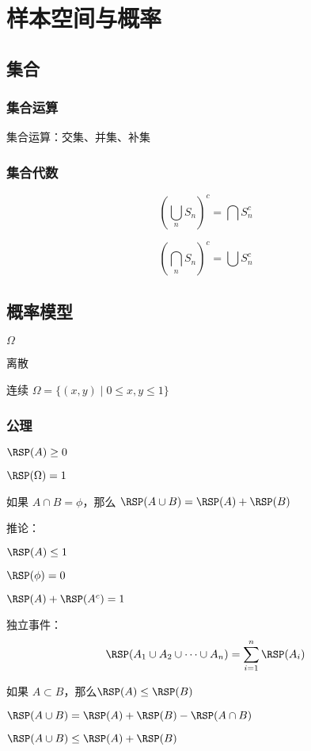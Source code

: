 \chapter{样本空间与概率}

\section{集合}

\subsection{集合运算}

集合运算：交集、并集、补集

\subsection{集合代数}


$$(\bigcup_n S_n)^c = \bigcap S_n^c$$ 

$$(\bigcap_n S_n)^c = \bigcup S_n^c$$ 

\section{概率模型}

 $\Omega$

离散

连续 $\Omega = \{(x,y) \mid 0 \leq x, y \leq 1 \}$ 

\subsection{公理}
 

 \begin{ol}
   \item $\RSP(A) \geq 0$
   \item $\RSP(\Omega) = 1$
   \item 如果 $A \cap B = \phi$，那么 $\RSP(A \cup B) = \RSP(A) + \RSP(B)$
 \end{ol}

 推论：

\begin{ul}
  \item $\RSP(A) \leq 1$
  \item $\RSP(\phi) = 0$
  \item $\RSP(A) + \RSP(A^c) = 1$
  \item 独立事件：$$\RSP(A_1 \cup A_2 \cup \cdots \cup A_n) = \sum_{i=1}^n \RSP(A_i)$$
  \item 如果 $A \subset B$，那么$\RSP(A) \leq \RSP(B)$
  \item $\RSP(A \cup B) = \RSP(A) + \RSP(B) - \RSP(A \cap B)$
  \item $\RSP(A \cup B) \leq \RSP(A) + \RSP(B)$
\end{ul}


